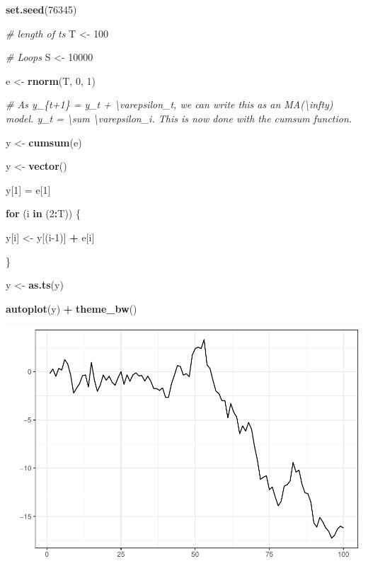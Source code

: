 \documentclass[11pt, a4paper]{report}
\newenvironment{Shaded}{\begin{snugshade}}{\end{snugshade}}
\newcommand{\CommentTok}[1]{\textcolor[rgb]{0.56,0.35,0.01}{\textit{#1}}}
\newcommand{\ControlFlowTok}[1]{\textcolor[rgb]{0.13,0.29,0.53}{\textbf{#1}}}
\newcommand{\DecValTok}[1]{\textcolor[rgb]{0.00,0.00,0.81}{#1}}
\newcommand{\KeywordTok}[1]{\textcolor[rgb]{0.13,0.29,0.53}{\textbf{#1}}}
\newcommand{\NormalTok}[1]{#1}
\newcommand{\OperatorTok}[1]{\textcolor[rgb]{0.81,0.36,0.00}{\textbf{#1}}}
\newcommand{\StringTok}[1]{\textcolor[rgb]{0.31,0.60,0.02}{#1}}
\theoremstyle{plain}
\theoremstyle{plain}
\theoremstyle{remark}
\begin{document}
\begin{Shaded}
\begin{Highlighting}[]
\KeywordTok{set.seed}\NormalTok{(}\DecValTok{76345}\NormalTok{)}

\CommentTok{# length of ts}
\NormalTok{T <-}\StringTok{ }\DecValTok{100}

\CommentTok{# Loops}
\NormalTok{S <-}\StringTok{ }\DecValTok{10000}

\NormalTok{e <-}\StringTok{ }\KeywordTok{rnorm}\NormalTok{(T, }\DecValTok{0}\NormalTok{, }\DecValTok{1}\NormalTok{)}

\CommentTok{# As y_\{t+1\} = y_t + \textbackslash{}varepsilon_t, we can write this as an MA(\textbackslash{}infty) model. y_t = \textbackslash{}sum \textbackslash{}varepsilon_i. This is now done with the cumsum function.}

\NormalTok{y <-}\StringTok{ }\KeywordTok{cumsum}\NormalTok{(e)}

\NormalTok{y <-}\StringTok{ }\KeywordTok{vector}\NormalTok{()}

\NormalTok{y[}\DecValTok{1}\NormalTok{] =}\StringTok{ }\NormalTok{e[}\DecValTok{1}\NormalTok{]}

\ControlFlowTok{for}\NormalTok{ (i }\ControlFlowTok{in}\NormalTok{ (}\DecValTok{2}\OperatorTok{:}\NormalTok{T)) \{}

\NormalTok{    y[i] <-}\StringTok{ }\NormalTok{y[(i}\DecValTok{-1}\NormalTok{)] }\OperatorTok{+}\StringTok{ }\NormalTok{e[i]}

\NormalTok{\}}

\NormalTok{y <-}\StringTok{ }\KeywordTok{as.ts}\NormalTok{(y)}

\KeywordTok{autoplot}\NormalTok{(y) }\OperatorTok{+}\StringTok{ }\KeywordTok{theme_bw}\NormalTok{()}
\end{Highlighting}
\end{Shaded}

\begin{center}\includegraphics{Econo2_P6_files/figure-latex/monte carlo 1-1} \end{center}
\end{document}
